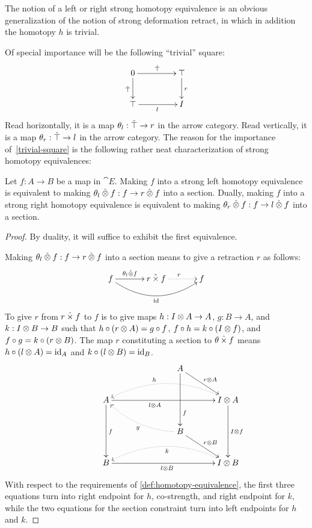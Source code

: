 \documentclass[reqno,10pt,a4paper,oneside]{amsart}
\begin{document}
The notion of a left or right strong homotopy equivalence is an obvious generalization of the notion of strong deformation retract, in which in addition the homotopy $h$ is trivial.

Of special importance will be the following ``trivial'' square:
\begin{equation}
\label{trivial-square}
\begin{gathered}
\xymatrix@C+2em{
  0
  \ar[r]^{\hatunit}
  \ar[d]_{\hatunit}
&
  \unit
  \ar[d]^{\intervalr}
\\
  \unit
  \ar[r]_{\intervall}
&
  \interval
}
\end{gathered}
\end{equation}
Read horizontally, it is a map $\theta_{l} : \hat{\top} \to r$ in the arrow category.
Read vertically, it is a map $\theta_{r} : \hat{\top} \to l$ in the arrow category.
The reason for the importance of~\eqref{trivial-square} is the following rather neat characterization of strong homotopy equivalences:
\begin{lemma}
\label{strong-h-equiv-as-section}
Let $f : A \to B$ be a map in $\cat{E}$.
Making $f$ into a strong left homotopy equivalence is equivalent to making $\theta_{l} \mathbin{\hat{\otimes}} f : f \to r \mathbin{\hat{\otimes}} f$ into a section.
Dually, making $f$ into a strong right homotopy equivalence is equivalent to making $\theta_{r} \mathbin{\hat{\otimes}} f : f \to l \mathbin{\hat{\otimes}} f$ into a section.
\end{lemma}

\begin{proof}
By duality, it will suffice to exhibit the first equivalence.

Making $\theta_{l} \mathbin{\hat{\otimes}} f : f \to r \mathbin{\hat{\otimes}} f$ into a section means to give a retraction $r$ as follows:
\[
\xymatrix@C+1em{
  f
  \ar[r]^-{\thetal \hatotimes f}
  \ar@/_2em/[rr]_{\id}
&
  \intervalr \hattimes f
  \ar@{.>}[r]^{r}
&
  f
}
\]
To give $r$ from $r \mathbin{\hat{\times}} f$ to $f$ is to give maps $h : I \otimes A \to A$, $g : B \to A$, and $k : I \otimes B \to B$ such that $h \mathbin{\circ} (r \otimes A) = g \mathbin{\circ} f$, $f \mathbin{\circ} h = k \mathbin{\circ} (I \otimes f)$, and $f \mathbin{\circ} g = k \mathbin{\circ} (r \otimes B)$.
The map $r$ constituting a section to $\theta \mathbin{\hat{\times}} f$ means $h \mathbin{\circ} (l \otimes A) = \operatorname{id}_A$ and $k \mathbin{\circ} (l \otimes B) = \operatorname{id}_B$.
\[
\xymatrix@C+1em{
&&&
  A
  \ar[dr]^{\intervalr \otimes A}
  \ar[dd]^(0.7){f}
\\&
  A
  \ar[dd]^{f}
  \ar[rrr]_(0.4){\intervall \otimes A}
&&&
  \interval \otimes A
  \ar[dd]^{\interval \otimes f}
  \ar@{.>}@/_2em/[lll]_(0.6){h}
\\&&&
  B
  \ar[dr]^{\intervalr \otimes B}
  \ar@{.>}@/^1em/[llu]^{g}
\\&
  B
  \ar[rrr]_{\intervall \otimes B}
&&&
  \interval \otimes B
  \ar@{.>}@/_2em/[lll]^{k}
}
\]
With respect to the requirements of \cref{def:homotopy-equivalence}, the first three equations turn into right endpoint for $h$, co-strength, and right endpoint for $k$, while the two equations for the section constraint turn into left endpoints for $h$ and $k$.
\end{proof}
\end{document}
